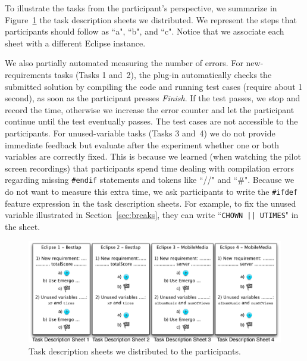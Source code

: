 To illustrate the tasks from the participant's perspective, we summarize in Figure~\ref{fig:maintenance-tasks} the task description sheets we distributed. We represent the steps that participants should follow as ``a", ``b", and ``c". Notice that we associate each sheet with a different Eclipse instance.

We also partially automated measuring the number of errors. For new-requirements tasks (Tasks 1 and~2), the plug-in automatically checks the submitted solution by compiling the code and running test cases (require about 1 second), as soon as the participant presses \emph{Finish}. If the test passes, we stop and record the time, otherwise we increase the error counter and let the participant continue until the test eventually passes. The test cases are not accessible to the participants. For unused-variable tasks (Tasks 3 and~4) we do not provide immediate feedback but evaluate after the experiment whether one or both variables are correctly fixed. This is because we learned (when watching the pilot screen recordings) that participants spend time dealing with compilation errors regarding missing \texttt{\/\/\#endif} statements and tokens like ``//" and ``\#". Because we do not want to measure this extra time, we ask participants to write the \texttt{\#ifdef} feature expression in the task description sheets. For example, to fix the unused variable illustrated in Section~\ref{sec:breaks}, they can write ``\texttt{CHOWN || UTIMES}" in the sheet.

\begin{figure}[tp]
\centering
\includegraphics[width=\linewidth]{images/Maintenance-Tasks.pdf}
\caption{Task description sheets we distributed to the participants.}
\label{fig:maintenance-tasks}
\end{figure}


